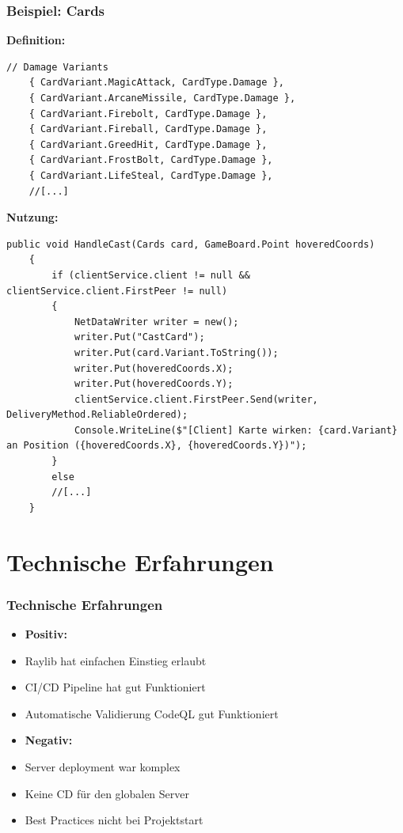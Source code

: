 \documentclass{beamer}
\begin{document}
\begin{frame}[fragile]
  \frametitle{Beispiel: Cards}
  \textbf{Definition: }
  \begin{lstlisting}[language=CSharp, basicstyle=\ttfamily\tiny, breaklines=true]
    // Damage Variants
    { CardVariant.MagicAttack, CardType.Damage },
    { CardVariant.ArcaneMissile, CardType.Damage },
    { CardVariant.Firebolt, CardType.Damage },
    { CardVariant.Fireball, CardType.Damage },
    { CardVariant.GreedHit, CardType.Damage },
    { CardVariant.FrostBolt, CardType.Damage },
    { CardVariant.LifeSteal, CardType.Damage },
    //[...]
  \end{lstlisting}
  \textbf{Nutzung: }
  \begin{lstlisting}[language=CSharp, basicstyle=\ttfamily\tiny, breaklines=true]
    public void HandleCast(Cards card, GameBoard.Point hoveredCoords)
    {
        if (clientService.client != null && clientService.client.FirstPeer != null)
        {
            NetDataWriter writer = new();
            writer.Put("CastCard");
            writer.Put(card.Variant.ToString());
            writer.Put(hoveredCoords.X);
            writer.Put(hoveredCoords.Y);
            clientService.client.FirstPeer.Send(writer, DeliveryMethod.ReliableOrdered);
            Console.WriteLine($"[Client] Karte wirken: {card.Variant} an Position ({hoveredCoords.X}, {hoveredCoords.Y})");
        }
        else
        //[...]
    }
  \end{lstlisting}
\end{frame}

\section{Technische Erfahrungen}
\begin{frame}
\frametitle{Technische Erfahrungen}
  \begin{multicols}{2}
    \begin{itemize}
      \item \textbf{Positiv:}
      \item Raylib hat einfachen Einstieg erlaubt
      \item CI/CD Pipeline hat gut Funktioniert
      \item Automatische Validierung CodeQL gut Funktioniert
    \end{itemize}
    \columnbreak
    \begin{itemize}
      \item \textbf{Negativ:}
      \item Server deployment war komplex
      \item Keine CD für den globalen Server
      \item Best Practices nicht bei Projektstart
    \end{itemize}
  \end{multicols}
\end{frame}
\end{document}

